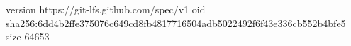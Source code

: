 version https://git-lfs.github.com/spec/v1
oid sha256:6dd4b2ffe375076c649cd8fb4817716504adb5022492f6f43e336cb552b4bfe5
size 64653
